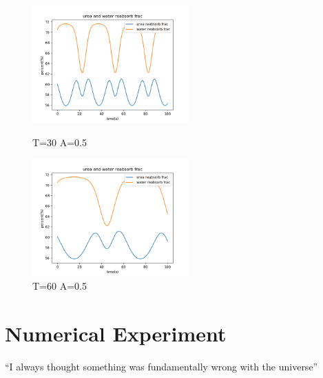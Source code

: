 \documentclass{article}
\begin{document}
\begin{figure}[H]
\centering
\begin{minipage}[t]{0.48\textwidth}
\centering
\includegraphics[width=6cm]{figure/figure7.png}
\caption{T=30 A=0.5}
\end{minipage}
\begin{minipage}[t]{0.48\textwidth}
\centering
\includegraphics[width=6cm]{figure/figure8.png}
\caption{T=60 A=0.5}
\end{minipage}
\end{figure}


\section{Numerical Experiment}
``I always thought something was fundamentally wrong with the universe'' \citep{adams1995hitchhiker}



\end{document}

